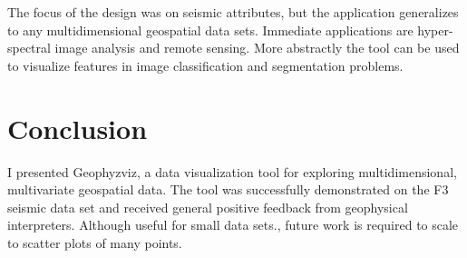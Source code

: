 \documentclass[journal]{vgtc}                %
\begin{document}
The focus of the design was on seismic attributes, but the application generalizes to any multidimensional
geospatial data sets. Immediate applications are hyper-spectral image analysis and remote sensing. More abstractly
the tool can be used to visualize features in image classification and segmentation problems.


\section{Conclusion}
I presented Geophyzviz, a data visualization tool for exploring multidimensional, multivariate
geospatial data. The tool was successfully demonstrated on the F3 seismic data set and received
general positive feedback from geophysical interpreters. Although useful for small data sets., future work is required to scale to scatter plots of many points. 




\end{document}
